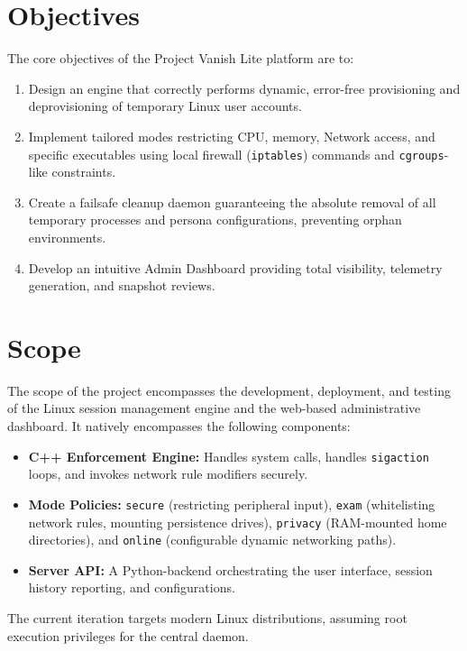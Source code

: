 \section{Objectives}
The core objectives of the Project Vanish Lite platform are to:
\begin{enumerate}
    \item Design an engine that correctly performs dynamic, error-free provisioning and deprovisioning of temporary Linux user accounts.
    \item Implement tailored modes restricting CPU, memory, Network access, and specific executables using local firewall (\texttt{iptables}) commands and \texttt{cgroups}-like constraints.
    \item Create a failsafe cleanup daemon guaranteeing the absolute removal of all temporary processes and persona configurations, preventing orphan environments.
    \item Develop an intuitive Admin Dashboard providing total visibility, telemetry generation, and snapshot reviews.
\end{enumerate}

\section{Scope}
The scope of the project encompasses the development, deployment, and testing of the Linux session management engine and the web-based administrative dashboard. It natively encompasses the following components:
\begin{itemize}
    \item \textbf{C++ Enforcement Engine:} Handles system calls, handles \texttt{sigaction} loops, and invokes network rule modifiers securely.
    \item \textbf{Mode Policies:} \texttt{secure} (restricting peripheral input), \texttt{exam} (whitelisting network rules, mounting persistence drives), \texttt{privacy} (RAM-mounted home directories), and \texttt{online} (configurable dynamic networking paths).
    \item \textbf{Server API:} A Python-backend orchestrating the user interface, session history reporting, and configurations.
\end{itemize}
The current iteration targets modern Linux distributions, assuming root execution privileges for the central daemon.
